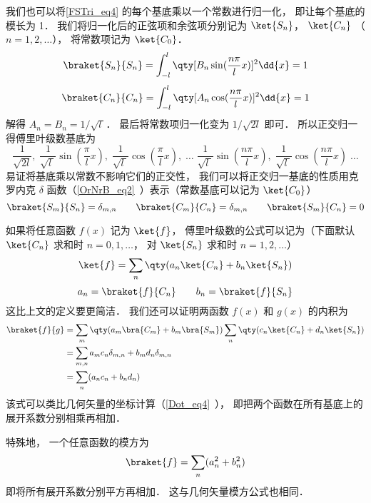 我们也可以将\autoref{FSTri_eq4} 的每个基底乘以一个常数进行归一化， 即让每个基底的模长为 1． 我们将归一化后的正弦项和余弦项分别记为 $\ket{S_n}$， $\ket{C_n}$ （$n = 1, 2,\dots$）， 将常数项记为 $\ket{C_0}$．
\begin{equation}
\braket{S_n}{S_n} = \int_{-l}^l \qty[B_n \sin(\frac{n\pi}{l}x)]^2 \dd{x} = 1
\end{equation}
\begin{equation}
\braket{C_n}{C_n} = \int_{-l}^l \qty[A_n \cos(\frac{n\pi}{l}x)]^2 \dd{x} = 1
\end{equation}
解得 $A_n = B_n = 1/\sqrt{l\ }$． 最后将常数项归一化变为 $1/\sqrt{2l}$ 即可． 所以正交归一得傅里叶级数基底为
\begin{equation}
\frac{1}{\sqrt{2l}},\;   \frac{1}{\sqrt{l\ }}\sin(\frac{\pi}{l} x),\;   \frac{1}{\sqrt{l\ }}\cos(\frac{\pi}{l} x),\;   \dots\;  \frac{1}{\sqrt{l\ }}\sin(\frac{n\pi}{l} x),\;   \frac{1}{\sqrt{l\ }}\cos(\frac{n\pi}{l} x)\;   \dots
\end{equation}
易证将基底乘以常数不影响它们的正交性， 我们可以将正交归一基底的性质用克罗内克 $\delta$ 函数（\autoref{OrNrB_eq2}~）表示（常数基底可以记为 $\ket{C_0}$）
\begin{equation}
\braket{S_m}{S_n} = \delta_{m,n}
\qquad
\braket{C_m}{C_n} = \delta_{m, n}
\qquad
\braket{S_m}{C_n} = 0
\end{equation}

如果将任意函数 $f(x)$ 记为 $\ket{f}$， 傅里叶级数的公式可以记为（下面默认 $\ket{C_n}$ 求和时 $n = 0, 1, \dots$， 对 $\ket{S_n}$ 求和时 $n = 1, 2, \dots$）
\begin{equation}
\ket{f} = \sum_n \qty(a_n \ket{C_n} + b_n \ket{S_n})
\end{equation}
\begin{equation}
a_n = \braket{f}{C_n}
\qquad
b_n = \braket{f}{S_n}
\end{equation}
这比上文的定义要更简洁． 我们还可以证明两函数 $f(x)$ 和 $g(x)$ 的内积为
\begin{equation}
\begin{aligned}
\braket{f}{g} &= \sum_m \qty(a_m \bra{C_m} + b_m \bra{S_m}) \sum_n \qty(c_n \ket{C_n} + d_n \ket{S_n})\\
&= \sum_{m, n} a_m c_n \delta_{m, n} + b_m d_n \delta_{m, n}\\
&= \sum_n (a_n c_n + b_n d_n)
\end{aligned}
\end{equation}
该式可以类比几何矢量的坐标计算（\autoref{Dot_eq4}~）， 即把两个函数在所有基底上的展开系数分别相乘再相加．

特殊地， 一个任意函数的模方为
\begin{equation}
\braket{f} = \sum_n (a_n^2 + b_n^2)
\end{equation}
即将所有展开系数分别平方再相加． 这与几何矢量模方公式也相同．
